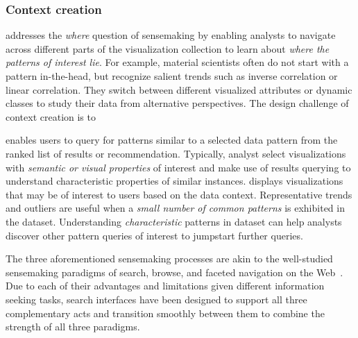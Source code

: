 {  \subsubsection{Context creation}
   addresses the \textit{where}
  question of sensemaking by enabling analysts
  to navigate across different parts of the visualization
  collection to learn about \textit{where  the patterns of interest lie}.
  For example, material scientists often do not start
  with a pattern in-the-head, but recognize salient
  trends such as inverse correlation or linear correlation.
  They switch between different visualized attributes or dynamic
  classes to study their data from alternative perspectives.
  The design challenge of context creation is to 

   enables users to query for patterns similar to a selected data pattern from the ranked list of results or recommendation. Typically, analyst select visualizations with \emph{semantic or visual properties} of interest and make use of results querying to understand characteristic properties of similar instances.
   displays visualizations that may be of interest to users based on the data context. Representative trends and outliers are useful when a \emph{small number of common patterns} is exhibited in the dataset. Understanding \emph{characteristic} patterns in dataset can help analysts discover other pattern queries of interest to jumpstart further queries.

  \par\noindent The three aforementioned sensemaking processes are akin to the well-studied sensemaking paradigms of search, browse, and faceted navigation on the Web~\cite{Hearst2009,Olston2003}. Due to each of their advantages and limitations given different information seeking tasks, search interfaces have been designed to support all three complementary acts and transition smoothly between them to combine the strength of all three paradigms. 
}

